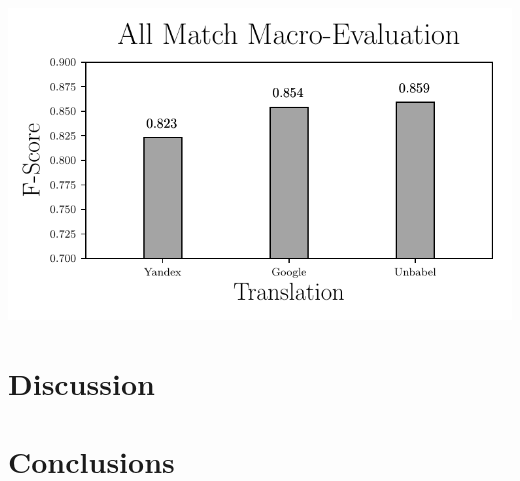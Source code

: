 \includegraphics{SupportFiles/plots/All_Match_Macro_plot.pdf}


\section{Discussion}





\section{Conclusions}




  
